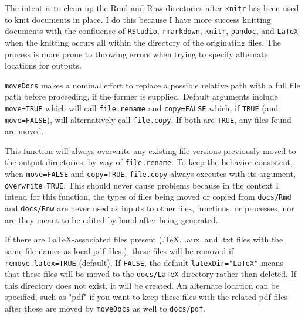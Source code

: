 \documentclass{article}\usepackage[]{graphicx}\usepackage[]{color}
\begin{document}
The intent is to clean up the Rmd and Rnw directories after \texttt{knitr} has been used to knit documents in place.
I do this because I have more success knitting documents with the confluence of \texttt{RStudio}, \texttt{rmarkdown}, \texttt{knitr}, \texttt{pandoc}, and \texttt{LaTeX} when the knitting occurs all within the directory of the originating files.
The process is more prone to throwing errors when trying to specify alternate locations for outputs.

\texttt{moveDocs} makes a nominal effort to replace a possible relative path with a full file path before proceeding, if the former is supplied.
Default arguments include \texttt{move=TRUE} which will call \texttt{file.rename} and \texttt{copy=FALSE} which, if \texttt{TRUE} (and \texttt{move=FALSE}), will alternatively call \texttt{file.copy}.
If both are \texttt{TRUE}, any files found are moved.

This function will always overwrite any existing file versions previously moved to the output directories, by way of \texttt{file.rename}.
To keep the behavior consistent, when \texttt{move=FALSE} and \texttt{copy=TRUE}, \texttt{file.copy} always executes with its argument, \texttt{overwrite=TRUE}.
This should never cause problems because in the context I intend for this function,
the types of files being moved or copied from \texttt{docs/Rmd} and \texttt{docs/Rnw} are never used as inputs to other files, functions, or processes,
nor are they meant to be edited by hand after being generated.

If there are LaTeX-associated files present (.TeX, .aux, and .txt files with the same file names as local pdf files.),
these files will be removed if \texttt{remove.latex=TRUE} (default).
If \texttt{FALSE}, the default \texttt{latexDir="LaTeX"} means that these files will be moved to the \texttt{docs/LaTeX} directory rather than deleted.
If this directory does not exist, it will be created.
An alternate location can be specified, such as "pdf" if you want to keep these files with the related pdf files after those are moved by \texttt{moveDocs} as well to \texttt{docs/pdf}.
\end{document}
